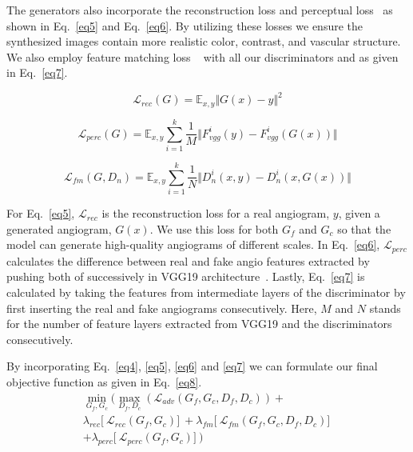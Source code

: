 \documentclass[a4paper,conference]{IEEEtran}
\begin{document}
The generators also incorporate the reconstruction loss and perceptual loss~\cite{johnson2016perceptual} as shown in Eq.~\ref{eq5} and Eq.~\ref{eq6}. By utilizing these losses we ensure the synthesized images contain more realistic color, contrast, and vascular structure. We also employ feature matching loss ~\cite{wang2018high} with all our discriminators and as given in Eq.~\ref{eq7}.

\begin{equation}
    \mathcal{L}_{rec}(G) = \mathbb{E}_{x,y} \Vert G(x) - y \Vert^2
    \label{eq5}
\end{equation}


\begin{equation}
    \mathcal{L}_{perc}(G) = \mathbb{E}_{x,y} \sum_{i=1}^{k}\frac{1}{M} \Vert F_{vgg}^{i}(y) - F_{vgg}^{i}(G(x))\Vert
    \label{eq6}
\end{equation}

\begin{equation}
    \mathcal{L}_{fm}(G,D_{n}) = \mathbb{E}_{x,y} \sum_{i=1}^{k}\frac{1}{N} \Vert D_{n}^{i}(x,y) - D_{n}^{i}(x,G(x))\Vert
    \label{eq7}
\end{equation}

For Eq.~\ref{eq5}, $\mathcal{L}_{rec}$ is the reconstruction loss for a real angiogram, $y$, given a generated angiogram, $G(x)$. We use this loss for both $G_{f}$ and $G_{c}$ so that the model can generate high-quality angiograms of different scales. In Eq.~\ref{eq6}, $\mathcal{L}_{perc}$ calculates the difference between real and fake angio features extracted by pushing both of successively in VGG19 architecture~\cite{simonyan2014very}.  Lastly, Eq.~\ref{eq7} is calculated by taking the features from intermediate layers of the discriminator by first inserting the real and fake angiograms consecutively. Here, $M$ and $N$ stands for the number of feature layers extracted from VGG19 and the discriminators consecutively.

By incorporating Eq.~\ref{eq4}, \ref{eq5}, \ref{eq6} and \ref{eq7} we can formulate our final objective function as given in Eq.~\ref{eq8}.
\begin{multline}
\min \limits_{G_{f},G_{c}} \big( \max \limits_{D_{f},D_{c}}  (\mathcal{L}_{adv}(G_{f},G_{c}, D_{f},D_{c})) + \\ \lambda_{rec}\big[\ \mathcal{L}_{rec}(G_{f},G_{c})\big]\ + 
\lambda_{fm}\big[\ \mathcal{L}_{fm}(G_{f},G_{c}, D_{f},D_{c})\big]\ \\ + \lambda_{perc}\big[\ \mathcal{L}_{perc}(G_{f},G_{c})\big]\ \big)
\label{eq8}
\end{multline}
\end{document}
